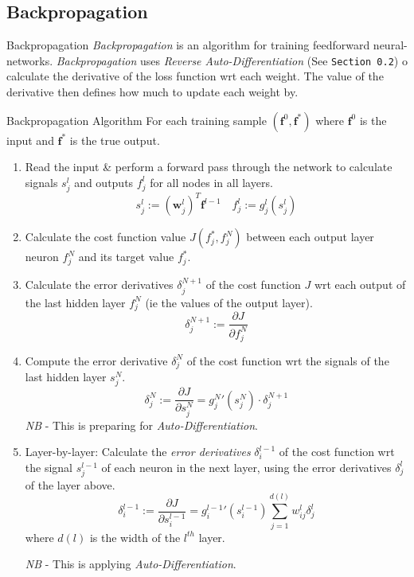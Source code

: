 \documentclass[11pt,a4paper]{article}
\begin{document}
\subsection{Backpropagation} \label{sec_Backpropagation}

  \begin{definition}{Backpropagation}
    \textit{Backpropagation} is an algorithm for training feedforward neural-networks. \textit{Backpropagation} uses \textit{Reverse Auto-Differentiation} (See \texttt{Section 0.2}) o calculate the derivative of the loss function wrt each weight. The value of the derivative then defines how much to update each weight by.
  \end{definition}

  \begin{proposition}{Backpropagation Algorithm}
    For each training sample $(\mathbf{f}^0,\mathbf{f}^*)$ where $\mathbf{f}^0$ is the input and $\mathbf{f}^*$ is the true output.
    \begin{enumerate}
      \item Read the input \& perform a forward pass through the network to calculate signals $s_j^l$ and outputs $f_j^l$ for all nodes in all layers.
      \[  s_j^l:=(\mathbf{w}_j^l)^T\mathbf{f}^{l-1}\quad f_j^l:=g_j^l(s_j^l) \]

      \item Calculate the cost function value $J(f_j^*,f_j^N)$ between each output layer neuron $f_j^N$ and its target value $f_j^*$.

      \item Calculate the error derivatives $\delta_j^{N+1}$ of the cost function $J$ wrt each output of the last hidden layer $f_j^N$ (ie the values of the output layer).
      \[ \delta_j^{N+1}:=\frac{\partial J}{\partial f_j^N} \]

      \item Compute the error derivative $\delta_j^N$ of the cost function wrt the signals of the last hidden layer $s_j^N$.
      \[ \delta_j^N:=\frac{\partial J}{\partial s_j^N}={g_j^N}'(s_j^N)\cdot\delta_j^{N+1} \]
      \textit{NB} - This is preparing for \textit{Auto-Differentiation}.

      \item Layer-by-layer: Calculate the \textit{error derivatives} $\delta_i^{l-1}$ of the cost function wrt the signal $s_j^{l-1}$  of each neuron in the next layer, using the error derivatives $\delta_j^l$ of the layer above.
      \[ \delta_i^{l-1}:=\frac{\partial J}{\partial s_i^{l-1}}={g_i^{l-1}}'(s_i^{l-1})\sum_{j=1}^{d(l)}w_{ij}^l\delta_j^l \]
      where $d(l)$ is the width of the $l^{th}$ layer.
      \par \textit{NB} - This is applying \textit{Auto-Differentiation}.


\end{enumerate}
\end{proposition}
\end{document}
